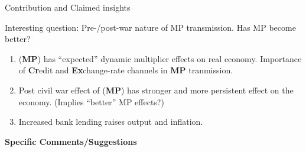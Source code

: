 \documentclass[10pt,english,slidetop,compress,
              blue,mathserif,color=option]{beamer}
\theoremstyle{plain}
\theoremstyle{definition}
\begin{document}
\begin{frame}{Contribution and Claimed insights}

  Interesting question: Pre-/post-war nature of MP transmission. Has MP become better?

  \begin{enumerate}
    \item (\textbf{MP}) has ``expected'' dynamic multiplier effects on real economy. Importance of \textbf{Cr}edit and \textbf{Ex}change-rate channels in \textbf{MP} tranmission.
    
    \bigskip

    \item Post civil war effect of (\textbf{MP}) has stronger and more persistent effect on the economy. (Implies ``better'' MP effects?)
    
    \bigskip

  \item Increased bank lending raises output and inflation.
  \end{enumerate}
  
\end{frame}

{
  \begin{frame}
    \begin{center}
      \bigskip
      \bigskip
      {\Huge\bfseries{\color{orange}Specific Comments/Suggestions}}
      \bigskip

    \end{center}
  \end{frame}
}
\end{document}
